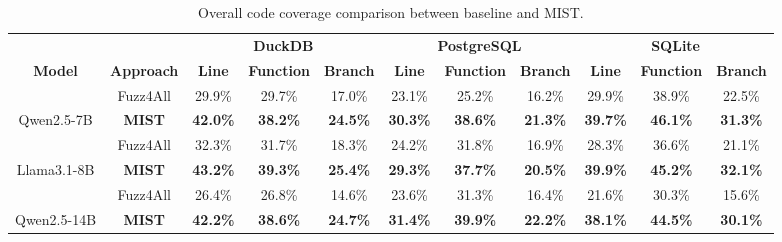 \begin{table}[]
\caption{Overall code coverage comparison between baseline and MIST.}
\label{table:rq1}
\begin{tabular}{c|c|ccc|ccc|ccc}
\toprule
 &  & \multicolumn{3}{c|}{\textbf{DuckDB}} & \multicolumn{3}{c|}{\textbf{PostgreSQL}} & \multicolumn{3}{c}{\textbf{SQLite}} \\ \cline{3-11} 
\multirow{-2}{*}{\textbf{Model}} & \multirow{-2}{*}{\textbf{Approach}} & \textbf{Line} & \textbf{Function} & \textbf{Branch} & \textbf{Line} & \textbf{Function} & \textbf{Branch} & \textbf{Line} & \textbf{Function} & \textbf{Branch} \\ \midrule
 & Fuzz4All & 29.9\% & 29.7\%  & 17.0\% & 23.1\% & 25.2\% & 16.2\% & 29.9\% & 38.9\%  & 22.5\% \\
\multirow{-2}{*}{Qwen2.5-7B} & \cellcolor[HTML]{ECF4FF}\textbf{MIST} & \cellcolor[HTML]{ECF4FF}\textbf{42.0\%} & \cellcolor[HTML]{ECF4FF}\textbf{38.2\%} & \cellcolor[HTML]{ECF4FF}\textbf{24.5\%} & \cellcolor[HTML]{ECF4FF}\textbf{30.3\%} & \cellcolor[HTML]{ECF4FF}\textbf{38.6\%} & \cellcolor[HTML]{ECF4FF}\textbf{21.3\%} & \cellcolor[HTML]{ECF4FF}\textbf{39.7\%} & \cellcolor[HTML]{ECF4FF}\textbf{46.1\%} & \cellcolor[HTML]{ECF4FF}\textbf{31.3\%} \\ \midrule
 & Fuzz4All & 32.3\% & 31.7\% & 18.3\% & 24.2\% & 31.8\% & 16.9\% & 28.3\% & 36.6\% & 21.1\% \\
\multirow{-2}{*}{Llama3.1-8B} & \cellcolor[HTML]{ECF4FF}\textbf{MIST} & \cellcolor[HTML]{ECF4FF}\textbf{43.2\%} & \cellcolor[HTML]{ECF4FF}\textbf{39.3\%} & \cellcolor[HTML]{ECF4FF}\textbf{25.4\%} & \cellcolor[HTML]{ECF4FF}\textbf{29.3\%} & \cellcolor[HTML]{ECF4FF}\textbf{37.7\%} & \cellcolor[HTML]{ECF4FF}\textbf{20.5\%} & \cellcolor[HTML]{ECF4FF}\textbf{39.9\%} & \cellcolor[HTML]{ECF4FF}\textbf{45.2\%} & \cellcolor[HTML]{ECF4FF}\textbf{32.1\%} \\ \midrule
 & Fuzz4All & 26.4\% & 26.8\% & 14.6\% & 23.6\% & 31.3\% & 16.4\% & 21.6\% & 30.3\% & 15.6\% \\
\multirow{-2}{*}{Qwen2.5-14B} & \cellcolor[HTML]{ECF4FF}\textbf{MIST} & \cellcolor[HTML]{ECF4FF}\textbf{42.2\%} & \cellcolor[HTML]{ECF4FF}\textbf{38.6\%} & \cellcolor[HTML]{ECF4FF}\textbf{24.7\%} & \cellcolor[HTML]{ECF4FF}\textbf{31.4\%} & \cellcolor[HTML]{ECF4FF}\textbf{39.9\%} & \cellcolor[HTML]{ECF4FF}\textbf{22.2\%} & \cellcolor[HTML]{ECF4FF}\textbf{38.1\%} & \cellcolor[HTML]{ECF4FF}\textbf{44.5\%} & \cellcolor[HTML]{ECF4FF}\textbf{30.1\%} \\ \midrule

\end{tabular}
\end{table}

